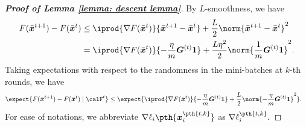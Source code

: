 \documentclass[letterpaper, 10 pt, conference]{ieeeconf}  %
\newcommand{\x}{{\bm x}}
\begin{document}
\begin{proof}[\bf Proof of Lemma \ref{lemma: descent lemma}]
By $L$-smoothness, we have 
\begin{align*}
F(\bar{\x}^{t+1})  -  F(\bar{\x}^{t}) & \le \iprod{\nabla F(\bar{\x}^{t})}{\bar{\x}^{t+1} - \bar{\x}^{t}} + \frac{L}{2}\norm{\bar{\x}^{t+1}- \bar{\x}^{t}}^2 \\
& = \iprod{\nabla F(\bar{\x}^{t})}{- \frac{\eta}{m} \bm{G}^{(t)} \bm{1}} +  \frac{L\eta^2}{2}\norm{\frac{1}{m} \bm{G}^{(t)} \bm{1}}^2.  
\end{align*}
Taking expectations with respect to the randomness in the mini-batches at $k$-th rounds, we have 
\begin{align*}
\expect{F(\bar{\x}^{t+1})  -  F(\bar{\x}^{t}) \mid \calF^{t}} & \le \expect{\iprod{\nabla F(\bar{\x}^{t})}{- \frac{\eta}{m} \bm{G}^{(t)} \bm{1}} +  \frac{L}{2}\norm{ - \frac{\eta}{m} \bm{G}^{(t)} \bm{1}}^2}. 
\end{align*}
For ease of notations, we abbreviate $\nabla \ell_i\pth{\x_i^{\pth{t,k}}}$ as $\nabla \ell_i^{\pth{t,k}}.$

\end{proof}
\end{document}
